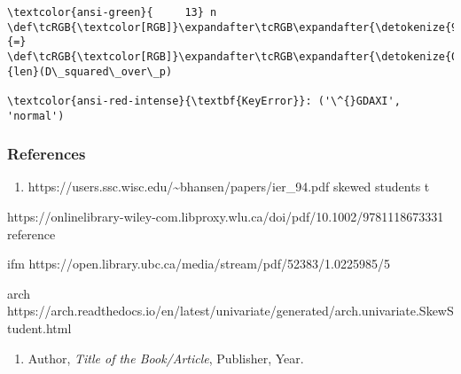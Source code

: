 \documentclass[11pt]{article}
\providecommand{\tightlist}{%
      \setlength{\itemsep}{0pt}\setlength{\parskip}{0pt}}
\begin{document}
\begin{Verbatim}[commandchars=\\\{\}, frame=single, framerule=2mm, rulecolor=\color{outerrorbackground}]
\textcolor{ansi-green}{     13} n \def\tcRGB{\textcolor[RGB]}\expandafter\tcRGB\expandafter{\detokenize{98,98,98}}{=} \def\tcRGB{\textcolor[RGB]}\expandafter\tcRGB\expandafter{\detokenize{0,135,0}}{len}(D\_squared\_over\_p)

\textcolor{ansi-red-intense}{\textbf{KeyError}}: ('\^{}GDAXI', 'normal')
    \end{Verbatim}

    \subsubsection{References}\label{references}

\begin{enumerate}
\def\labelenumi{\arabic{enumi}.}
\tightlist
\item
  https://users.ssc.wisc.edu/\textasciitilde bhansen/papers/ier\_94.pdf
  skewed students t
\end{enumerate}

https://onlinelibrary-wiley-com.libproxy.wlu.ca/doi/pdf/10.1002/9781118673331
reference

ifm https://open.library.ubc.ca/media/stream/pdf/52383/1.0225985/5

arch
https://arch.readthedocs.io/en/latest/univariate/generated/arch.univariate.SkewStudent.html

\begin{enumerate}
\def\labelenumi{\arabic{enumi}.}
\tightlist
\item
  Author, \emph{Title of the Book/Article}, Publisher, Year.
\end{enumerate}


    
    
    
\end{document}
